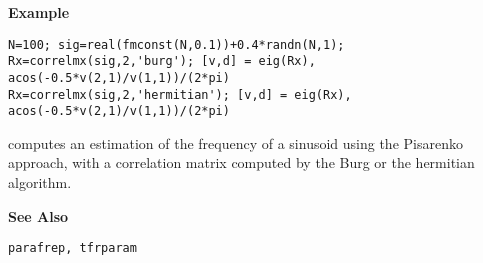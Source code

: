 {\bf \large {}\selectfont Example}\\
\hspace*{1.5cm}
\begin{minipage}[t]{13.5cm}
\begin{verbatim}
N=100; sig=real(fmconst(N,0.1))+0.4*randn(N,1); 
Rx=correlmx(sig,2,'burg'); [v,d] = eig(Rx), acos(-0.5*v(2,1)/v(1,1))/(2*pi)
Rx=correlmx(sig,2,'hermitian'); [v,d] = eig(Rx), acos(-0.5*v(2,1)/v(1,1))/(2*pi)
\end{verbatim}
computes an estimation of the frequency of a sinusoid using the Pisarenko
approach, with a correlation matrix computed by the Burg or the hermitian
algorithm.

\end{minipage}
\vspace*{.5cm}


{\bf \large {}\selectfont See Also}\\
\hspace*{1.5cm}
\begin{minipage}[t]{13.5cm}
\begin{verbatim}
parafrep, tfrparam
\end{verbatim}
\end{minipage}
